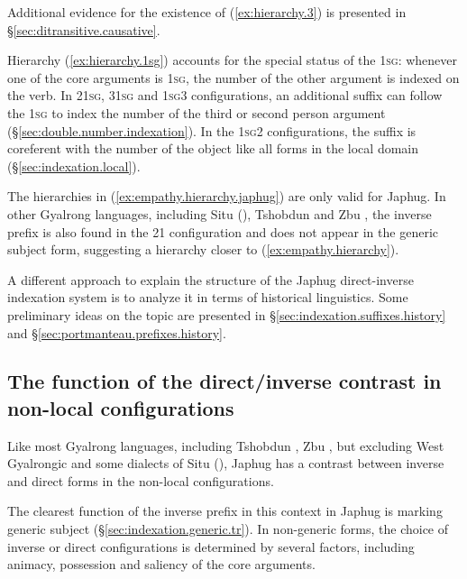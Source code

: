 Additional evidence for the existence of (\ref{ex:hierarchy.3}) is presented in §\ref{sec:ditransitive.causative}.

Hierarchy (\ref{ex:hierarchy.1sg}) accounts for the special status of the \textsc{1sg}: whenever one of the core arguments is \textsc{1sg}, the number of the other argument is indexed on the verb. In 2\fl{}\textsc{1sg}, 3\fl{}\textsc{1sg} and \textsc{1sg}\fl{}3 configurations, an additional suffix can follow the  \textsc{1sg} to index the number of the third or second person argument (§\ref{sec:double.number.indexation}). In the \textsc{1sg}\fl{}2 configurations, the suffix is coreferent with the number of the object like all forms in the local domain (§\ref{sec:indexation.local}). 

The hierarchies in (\ref{ex:empathy.hierarchy.japhug}) are only valid for Japhug. In other Gyalrong languages, including Situ (\citealt{delancey81direction, jackson15sastod, zhangsy19obviative}), Tshobdun \citep{jackson02rentongdengdi} and Zbu \citep{gongxun14agreement}, the inverse prefix is also found in the 2\fl{}1 configuration and does not appear in the generic subject form, suggesting a hierarchy closer to (\ref{ex:empathy.hierarchy}).

A different approach to explain the structure of the Japhug direct-inverse indexation system is to analyze it in terms of historical linguistics. Some preliminary ideas on the topic are presented in §\ref{sec:indexation.suffixes.history} and §\ref{sec:portmanteau.prefixes.history}.




\subsection{The function of the direct/inverse contrast in non-local configurations} \label{sec:inverse.3.3.saliency}
Like most Gyalrong languages, including Tshobdun \citep{jackson02rentongdengdi}, Zbu \citep{gongxun14agreement}, but excluding West Gyalrongic \citep{lai15person} and some dialects of Situ (\citealt{jackson15sastod, zhangsy19obviative}), Japhug has a contrast between inverse and direct forms in the non-local configurations.

The clearest function of the inverse prefix in this context in Japhug is marking generic subject (§\ref{sec:indexation.generic.tr}).  In non-generic forms, the choice of inverse or direct configurations is determined by several factors, including animacy, possession and saliency of the core arguments.

